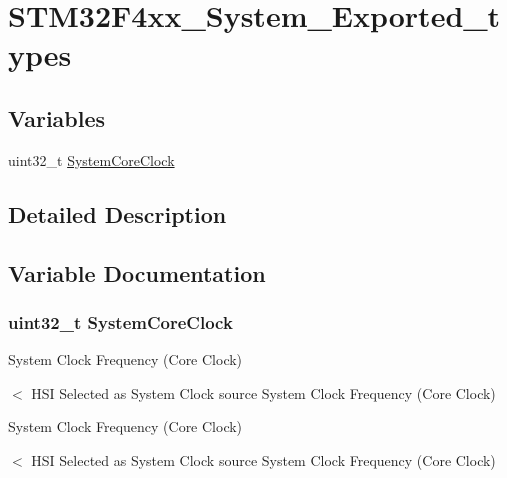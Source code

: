 \hypertarget{group___s_t_m32_f4xx___system___exported__types}{\section{S\-T\-M32\-F4xx\-\_\-\-System\-\_\-\-Exported\-\_\-types}
\label{group___s_t_m32_f4xx___system___exported__types}
}
\subsection*{Variables}
\begin{DoxyCompactItemize}
\item 
uint32\-\_\-t \hyperlink{group___s_t_m32_f4xx___system___exported__types_gaa3cd3e43291e81e795d642b79b6088e6}{System\-Core\-Clock}
\end{DoxyCompactItemize}


\subsection{Detailed Description}


\subsection{Variable Documentation}
\hypertarget{group___s_t_m32_f4xx___system___exported__types_gaa3cd3e43291e81e795d642b79b6088e6}{
\subsubsection[{System\-Core\-Clock}]{\setlength{\rightskip}{0pt plus 5cm}uint32\-\_\-t System\-Core\-Clock}}\label{group___s_t_m32_f4xx___system___exported__types_gaa3cd3e43291e81e795d642b79b6088e6}
System Clock Frequency (Core Clock)

$<$ H\-S\-I Selected as System Clock source System Clock Frequency (Core Clock)

System Clock Frequency (Core Clock)

$<$ H\-S\-I Selected as System Clock source System Clock Frequency (Core Clock) 
